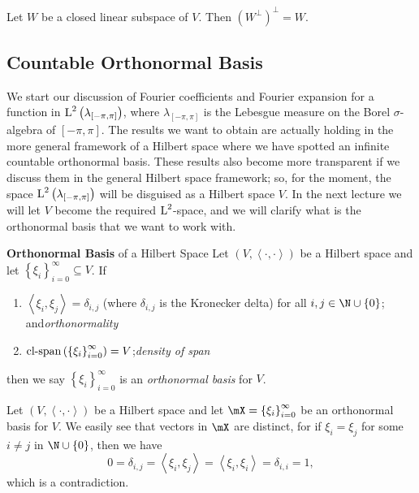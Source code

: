 \documentclass[pmath450]{subfiles}
\begin{document}
    \rruleline

    \begin{cor}{}
        Let $W$ be a closed linear subspace of $V$. Then $\left( W^{\perp} \right)^{\perp}=W$.
    \end{cor}	

    \rruleline
    
    \subsection{Countable Orthonormal Basis}

    We start our discussion of Fourier coefficients and Fourier expansion for a function in $\operatorname{L}^{2}\left( \lambda_{\left[ -\pi,\pi \right]} \right)$, where $\lambda_{\left[ -\pi,\pi \right]}$ is the Lebesgue measure on the Borel $\sigma$-algebra of $\left[ -\pi,\pi \right]$. The results we want to obtain are actually holding in the more general framework of a Hilbert space where we have spotted an infinite countable orthonormal basis. These results also become more transparent if we discuss them in the general Hilbert space framework; so, for the moment, the space $\operatorname{L}^{2}\left( \lambda_{\left[ -\pi,\pi \right]} \right)$ will be disguised as a Hilbert space $V$. In the next lecture we will let $V$ become the required $\operatorname{L}^{2}$-space, and we will clarify what is the orthonormal basis that we want to work with.
    
    \begin{definition}{\textbf{Orthonormal Basis} of a Hilbert Space}
        Let $\left( V,\left\langle \cdot, \cdot\right\rangle \right)$ be a Hilbert space and let $\left\lbrace \xi_i \right\rbrace^{\infty}_{i=0}\subseteq V$. If
        \begin{enumerate}
            \item $\left\langle \xi_i, \xi_j\right\rangle = \delta_{i,j}$ (where $\delta_{i,j}$ is the Kronecker delta) for all $i,j\in\N\cup\left\lbrace 0 \right\rbrace$; and\hfill\textit{orthonormality}
            \item $\operatorname{cl-span}\left( \left\lbrace \xi_i \right\rbrace^{\infty}_{i=0} \right)=V$;\hfill\textit{density of span}
        \end{enumerate}
        then we say $\left\lbrace \xi_i \right\rbrace^{\infty}_{i=0}$ is an \emph{orthonormal basis} for $V$.
    \end{definition}
    
    \np Let $\left( V,\left\langle \cdot, \cdot\right\rangle \right)$ be a Hilbert space and let $\mX = \left\lbrace \xi_i \right\rbrace^{\infty}_{i=0}$ be an orthonormal basis for $V$. We easily see that vectors in $\mX$ are distinct, for if $\xi_i=\xi_j$ for some $i\neq j$ in $\N\cup\left\lbrace 0 \right\rbrace$, then we have
    \begin{equation*}
        0 = \delta_{i,j} = \left\langle \xi_i, \xi_j\right\rangle = \left\langle \xi_i, \xi_i\right\rangle = \delta_{i,i} = 1,
    \end{equation*}
    which is a contradiction.
\end{document}
